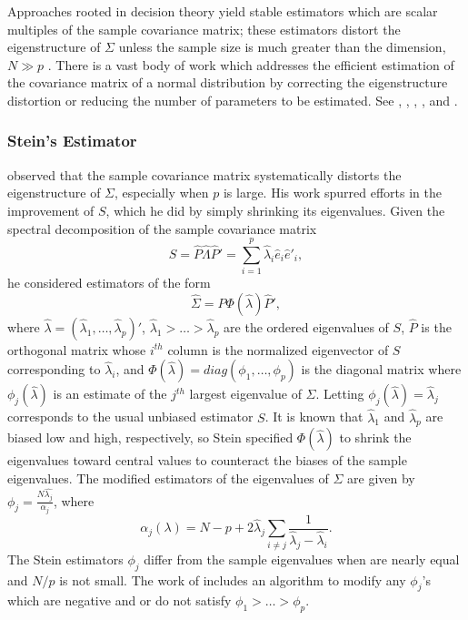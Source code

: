 \bigskip

Approaches rooted in decision theory yield stable estimators which are scalar multiples of the sample covariance matrix; these estimators distort the eigenstructure of $\Sigma$ unless the sample size is much greater than the dimension, $N \gg p$ \citep{dempster1972covariance}.  There is a vast body of work which addresses the efficient estimation of the covariance matrix of a normal distribution by correcting the eigenstructure distortion or reducing the number of parameters to be estimated. See \cite{stein1975estimation}, \cite{lin1985monte}, \cite{yang1994estimation}, \cite{daniels1999nonconjugate}, and \cite{champion2003empirical}. 

\subsubsection{Stein's Estimator}

\cite{stein1975estimation} observed that the sample covariance matrix systematically distorts the eigenstructure of $\Sigma$, especially when $p$ is large. His work spurred efforts in the improvement of $S$, which he did by simply shrinking its eigenvalues. Given the spectral decomposition of the sample covariance matrix
\[
S = \hat{P} \hat{\Lambda} \hat{P}' = \sum_{i = 1}^p \hat{\lambda}_i \hat{e}_i \hat{e}'_i,
\]
\noindent
he considered estimators of the form
\begin{equation}\label{eq:stein-eigen-estimator}
\hat{\Sigma} = \hat{P} \Phi\left(\hat{\lambda}\right) \hat{P}',
\end{equation}
\noindent
where $\hat{\lambda} = \left(\hat{\lambda}_1, \dots, \hat{\lambda}_p\right)'$, $\hat{\lambda}_1 > \dots > \hat{\lambda}_p$ are the ordered eigenvalues of $S$, $\hat{P}$ is the orthogonal matrix whose $i^{th}$ column is the normalized eigenvector of $S$ corresponding to $\hat{\lambda}_i$, and $\Phi\left(\hat{\lambda}\right) = diag\left(\phi_1,\dots, \phi_p \right)$ is the diagonal matrix where $\phi_j\left(\hat{\lambda} \right)$ is an estimate of the $j^{th}$ largest eigenvalue of $\Sigma$. Letting $\phi_j\left(\hat{\lambda} \right) = \hat{\lambda}_j$ corresponds to the usual unbiased estimator $S$. It is known that $\hat{\lambda}_1$ and $\hat{\lambda}_p$ are biased low and high, respectively, so Stein specified $\Phi\left(\hat{\lambda}\right)$ to shrink the eigenvalues toward central values to counteract the biases of the sample eigenvalues. The modified estimators of the eigenvalues of $\Sigma$ are given by $\phi_j = \frac{N \hat{\lambda_j}}{\alpha_j}$, where
\begin{equation}\label{eq:stein-eigen-estimator}
\alpha_j\left(\lambda\right) = N - p + 2\hat{\lambda}_j \sum_{i \ne j} \frac{1}{\hat{\lambda}_j - \hat{\lambda}_i}.
\end{equation}
\noindent
The Stein estimators $\phi_j$ differ from the sample eigenvalues when are nearly equal and $N/p$ is not small. The work of \cite{lin1985monte} includes an algorithm to modify any $\phi_j$'s which are negative and or do not satisfy $\phi_1 > \dots > \phi_p$.

